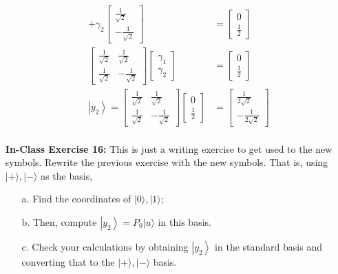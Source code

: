 \documentclass[main.tex]{subfiles}
\begin{document}
\begin{enumerate}
\begin{enumerate}
\begin{align*}
            + \gamma_{2} \left[\begin{array}{l} \frac{1}{\sqrt{2}} \\ -\frac{1}{\sqrt{2}} \end{array}\right]    & = \left[\begin{array}{c} 0 \\ \frac{1}{2} \end{array}\right]\\
            \left[\begin{array}{ll} \frac{1}{\sqrt{2}} & \frac{1}{\sqrt{2}} 
            \\ \frac{1}{\sqrt{2}} & -\frac{1}{\sqrt{2}} \end{array}\right]
            \left[\begin{array}{l} \gamma_{1} \\ \gamma_{2} \end{array}\right]                                  & = \left[\begin{array}{c} 0 \\ \frac{1}{2} \end{array}\right] \tag{matrix is unitary, inverse is the adjoint}\\
            \left|y_{2}\right\rangle =
            \left[\begin{array}{ll} \frac{1}{\sqrt{2}} & \frac{1}{\sqrt{2}} 
            \\ \frac{1}{\sqrt{2}} & -\frac{1}{\sqrt{2}} \end{array}\right]
            \left[\begin{array}{c} 0 \\ \frac{1}{2} \end{array}\right]                                          & = \left[\begin{array}{c} \frac{1}{2\sqrt{2}} \\ -\frac{1}{2\sqrt{2}} \end{array}\right] \tag{new basis}\\
        \end{align*}
        
    \end{enumerate}

\item[] \textbf{In-Class Exercise 16:} This is just a writing exercise to get used to the new symbols. Rewrite the previous exercise with the new symbols. That is, using $|+\rangle,|-\rangle$ as the basis, 

    \begin{enumerate}
    \item[a.] Find the coordinates of $|0\rangle,|1\rangle$;
    \item[b.] Then, compute $\left|y_{2}\right\rangle=P_{0}|u\rangle$ in this basis.
    \item[c.] Check your calculations by obtaining $\left|y_{2}\right\rangle$ in the standard basis and converting that to the $|+\rangle,|-\rangle$ basis.
    \end{enumerate}


\end{enumerate}
\end{document}

